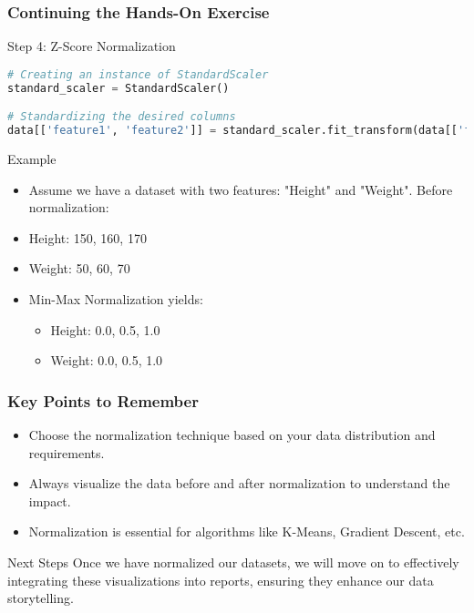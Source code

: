 \documentclass[aspectratio=169]{beamer}
\begin{document}
\begin{frame}[fragile]
    \frametitle{Continuing the Hands-On Exercise}
    \begin{block}{Step 4: Z-Score Normalization}
    \begin{lstlisting}[language=Python]
# Creating an instance of StandardScaler
standard_scaler = StandardScaler()

# Standardizing the desired columns
data[['feature1', 'feature2']] = standard_scaler.fit_transform(data[['feature1', 'feature2']])
    \end{lstlisting}
    \end{block}
    
    \begin{block}{Example}
    \begin{itemize}
        \item Assume we have a dataset with two features: "Height" and "Weight". Before normalization:
        \item Height: 150, 160, 170
        \item Weight: 50, 60, 70
        \item Min-Max Normalization yields:
            \begin{itemize}
                \item Height: 0.0, 0.5, 1.0
                \item Weight: 0.0, 0.5, 1.0
            \end{itemize}
    \end{itemize}
    \end{block}
\end{frame}

\begin{frame}[fragile]
    \frametitle{Key Points to Remember}
    \begin{itemize}
        \item Choose the normalization technique based on your data distribution and requirements.
        \item Always visualize the data before and after normalization to understand the impact.
        \item Normalization is essential for algorithms like K-Means, Gradient Descent, etc.
    \end{itemize}
    
    \begin{block}{Next Steps}
        Once we have normalized our datasets, we will move on to effectively integrating these visualizations into reports, ensuring they enhance our data storytelling.
    \end{block}
\end{frame}
\end{document}
